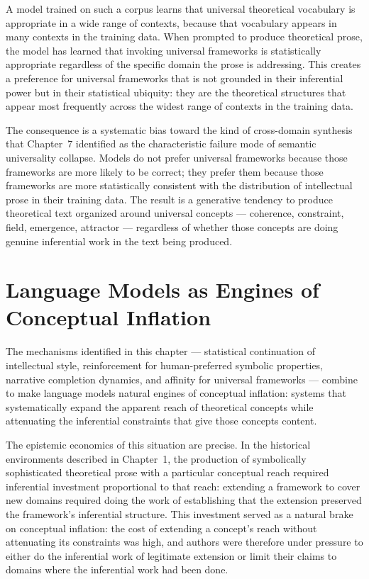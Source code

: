 \documentclass[12pt, openright, twoside]{book}
\begin{document}
A model trained on such a corpus learns that universal
theoretical vocabulary is appropriate in a wide range
of contexts, because that vocabulary appears in many
contexts in the training data. When prompted to produce
theoretical prose, the model has learned that invoking
universal frameworks is statistically appropriate
regardless of the specific domain the prose is addressing.
This creates a preference for universal frameworks
that is not grounded in their inferential power but
in their statistical ubiquity: they are the theoretical
structures that appear most frequently across the widest
range of contexts in the training data.

The consequence is a systematic bias toward the kind
of cross-domain synthesis that Chapter~7 identified
as the characteristic failure mode of semantic
universality collapse. Models do not prefer universal
frameworks because those frameworks are more likely
to be correct; they prefer them because those frameworks
are more statistically consistent with the distribution
of intellectual prose in their training data. The
result is a generative tendency to produce theoretical
text organized around universal concepts --- coherence,
constraint, field, emergence, attractor --- regardless
of whether those concepts are doing genuine inferential
work in the text being produced.

\section{Language Models as Engines of Conceptual Inflation}

The mechanisms identified in this chapter --- statistical
continuation of intellectual style, reinforcement for
human-preferred symbolic properties, narrative completion
dynamics, and affinity for universal frameworks ---
combine to make language models natural engines of
conceptual inflation: systems that systematically
expand the apparent reach of theoretical concepts
while attenuating the inferential constraints that
give those concepts content.

The epistemic economics of this situation are precise.
In the historical environments described in Chapter~1,
the production of symbolically sophisticated theoretical
prose with a particular conceptual reach required
inferential investment proportional to that reach:
extending a framework to cover new domains required
doing the work of establishing that the extension
preserved the framework's inferential structure.
This investment served as a natural brake on conceptual
inflation: the cost of extending a concept's reach
without attenuating its constraints was high, and
authors were therefore under pressure to either do
the inferential work of legitimate extension or limit
their claims to domains where the inferential work
had been done.
\end{document}

